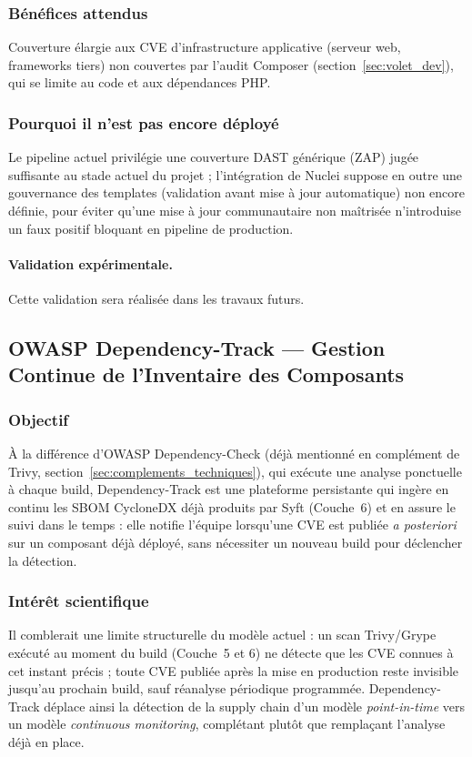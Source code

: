 \subsubsection{Bénéfices attendus}
Couverture élargie aux CVE d'infrastructure applicative (serveur web, frameworks tiers) non couvertes par l'audit Composer (section~\ref{sec:volet_dev}), qui se limite au code et aux dépendances PHP.

\subsubsection{Pourquoi il n'est pas encore déployé}
Le pipeline actuel privilégie une couverture DAST générique (ZAP) jugée suffisante au stade actuel du projet ; l'intégration de Nuclei suppose en outre une gouvernance des templates (validation avant mise à jour automatique) non encore définie, pour éviter qu'une mise à jour communautaire non maîtrisée n'introduise un faux positif bloquant en pipeline de production.

\paragraph{Validation expérimentale.} Cette validation sera réalisée dans les travaux futurs.


\subsection{OWASP Dependency-Track — Gestion Continue de l'Inventaire des Composants}
\label{subsec:dependency_track_perspective}

\subsubsection{Objectif}
À la différence d'OWASP Dependency-Check (déjà mentionné en complément de Trivy, section~\ref{sec:complements_techniques}), qui exécute une analyse ponctuelle à chaque build, Dependency-Track est une plateforme persistante qui ingère en continu les SBOM CycloneDX déjà produits par Syft (Couche~6) et en assure le suivi dans le temps : elle notifie l'équipe lorsqu'une CVE est publiée \textit{a posteriori} sur un composant déjà déployé, sans nécessiter un nouveau build pour déclencher la détection.

\subsubsection{Intérêt scientifique}
Il comblerait une limite structurelle du modèle actuel : un scan Trivy/Grype exécuté au moment du build (Couche~5 et 6) ne détecte que les CVE connues à cet instant précis ; toute CVE publiée après la mise en production reste invisible jusqu'au prochain build, sauf réanalyse périodique programmée. Dependency-Track déplace ainsi la détection de la supply chain d'un modèle \textit{point-in-time} vers un modèle \textit{continuous monitoring}, complétant plutôt que remplaçant l'analyse déjà en place.

